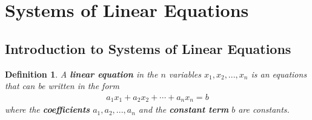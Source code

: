\documentclass{article}
\theoremstyle{sltheorem}
\newtheorem{definition}{Definition}[section]
\begin{document}
\section{Systems of Linear Equations}
\subsection{Introduction to Systems of Linear Equations}
\begin{definition}
    A \textbf{linear equation} in the $n$ variables $x_1, x_2, ..., x_n$ is an equations that can be written in the form
    \begin{gather*}
        a_1x_1+a_2x_2+\cdots+a_nx_n=b
    \end{gather*}
    where the \textbf{coefficients} $a_1, a_2, ..., a_n$ and the \textbf{constant term} $b$ are constants.
\end{definition}
\end{document}
